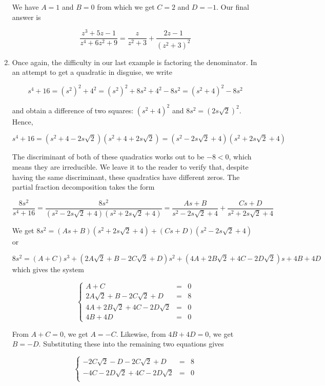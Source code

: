 \begin{ex}
\begin{enumerate}
We have $A = 1$ and $B = 0$ from which we get $C = 2$ and $D = -1$.  Our final answer is

\[ \dfrac{z^3+5z-1}{z^4+6z^2+9} = \dfrac{z}{z^2+3} + \dfrac{2z-1}{\left(z^2+3\right)^2}\]

\item  Once again, the difficulty in our last example is factoring the denominator.  In an attempt to get a quadratic in disguise, we write 

\[s^4 + 16 = \left(s^2\right)^2 + 4^2 = \left(s^2\right)^2 + 8s^2 + 4^2 - 8s^2 = \left(s^2+4\right)^2 - 8s^2\]

and obtain a difference of two squares:  $\left(s^2+4\right)^2$ and $8s^2 = \left(2s\sqrt{2}\right)^2$.  Hence,

\[s^4 + 16 = \left(s^2 + 4 - 2s\sqrt{2}\right)\left(s^2 + 4 + 2s\sqrt{2}\right) =\left(s^2 - 2s\sqrt{2} + 4\right)\left(s^2 + 2s\sqrt{2}+4 \right)  \]

The discriminant of both of these quadratics works out to be $-8 < 0$, which means they are irreducible.  We leave it to the reader to verify that, despite having the same discriminant, these quadratics have different zeros.  The partial fraction decomposition takes the form

\[ \dfrac{8s^2}{s^4+16} = \dfrac{8s^2}{\left(s^2 - 2s\sqrt{2} + 4\right)\left(s^2 + 2s\sqrt{2}+4 \right)} = \dfrac{As+B}{s^2 - 2s\sqrt{2} + 4} + \dfrac{Cs+D}{s^2 + 2s\sqrt{2} + 4}\]

We get $8s^2 = (As+B)\left(s^2 + 2s\sqrt{2}+4 \right) + (Cs+D)\left(s^2 - 2s\sqrt{2} + 4\right)$ or 

\[8s^2 = (A+C)s^3 + (2A\sqrt{2} + B - 2C\sqrt{2}+D)s^2 + (4A + 2B\sqrt{2}+4C - 2D\sqrt{2})s + 4B + 4D \] which gives the system

\[ \left\{ \begin{array}{rcr} A + C & = & 0 \\ 2A\sqrt{2} + B - 2C\sqrt{2}+D & = & 8 \\ 4A + 2B\sqrt{2}+4C - 2D\sqrt{2} & = & 0 \\ 4B + 4D  & = & 0 \end{array} \right.\]

From $A+C = 0$, we get $A = -C$.  Likewise, from $4B + 4D = 0$, we get $B = -D$.  Substituting these into the remaining two equations gives

\[ \left\{ \begin{array}{rcr}  -2C\sqrt{2} -D - 2C\sqrt{2}+D & = & 8 \\ -4C - 2D\sqrt{2}+4C - 2D\sqrt{2} & = & 0 \\ \end{array} \right.\] 


\end{enumerate}
\end{ex}
